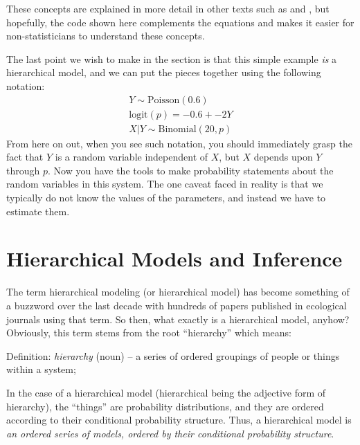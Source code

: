 These concepts are explained in more detail %
in other texts such as \citet{casella_berger:2002} and \citet{link_barker:2010}, but hopefully, the
code shown here complements the equations and makes it easier for
non-statisticians to understand these concepts.

The last point we wish
to make in the section is that this simple example \textit{is}
a hierarchical model, and we can put the pieces together using
the following notation:
\begin{gather}
  Y \sim \text{Poisson}(0.6) \\
  \text{logit}(p) = -0.6 + -2Y \\
  X|Y \sim \text{Binomial}(20, p)
\end{gather}
From here on out, when you see such notation, you should immediately
grasp the fact that $Y$ is a random variable independent of $X$, but
$X$ depends upon $Y$ through $p$. Now you have the tools to make
probability statements about the random variables in this system. The
one caveat faced in reality is that we typically do not know the
values of the parameters, and instead we have to estimate them. %




\section{Hierarchical Models and Inference}

The term hierarchical modeling (or hierarchical model) has become
something of a buzzword over the last decade with hundreds of papers
published in ecological journals using that term.  So then, what
exactly is a hierarchical model, anyhow? Obviously, this term stems
from the root ``hierarchy'' which means:

\vspace{.1in}

{\flushleft
Definition: {\it hierarchy} (noun) -- a series of ordered groupings of people or things within a system;
}

\vspace{.1in}

In the case of a hierarchical model (hierarchical being the adjective
form of hierarchy), the ``things'' are probability distributions, and
they are ordered according to their conditional probability structure.
Thus, a hierarchical model is {\it an ordered series of models,
  ordered by their conditional probability structure}.

